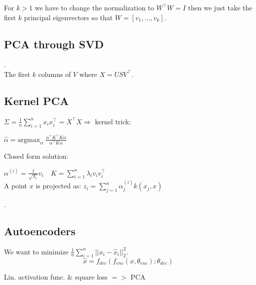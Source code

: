 For $k > 1$ we have to change the normalization to $W^\top W = I$ then we just take the first $k$ principal eigenvectors so that $W = [v_1, ..., v_k]$.

\subsection*{PCA through SVD}
\color{White} . \color {Black}\\[-10pt]
The first $k$ columns of $V$ where $X = U S V^\top$.

\subsection*{Kernel PCA}

$\Sigma = \frac{1}{n} \sum_{i=1}^n x_i x_i^\top = X^\top X \Rightarrow$  kernel trick:

\qquad \qquad $\hat{\alpha} = \text{argmax}_\alpha \; \frac{\alpha^\top K^\top K \alpha}{\alpha^\top K \alpha}$

Closed form solution:

\qquad \qquad $\alpha^{(i)} = \frac{1}{\sqrt{\lambda_i}}v_i \quad K = \sum_{i = 1}^n \lambda_i v_i v_i^\top$\\[-6pt]

A point $x$ is projected as:
$z_i = \sum_{j=1}^n \alpha_j^{(i)} k(x_j, x)$

\color{White} . \color {Black}\\[-18pt]

\subsection*{Autoencoders}

We want to minimize $\frac{1}{n}\sum_{i=1}^n ||x_i - \hat{x}_i||_2^2$.
$$\hat{x} = f_{dec}(f_{enc}(x, \theta_{enc}); \theta_{dec})$$

Lin. activation func. \& square loss $=>$ PCA